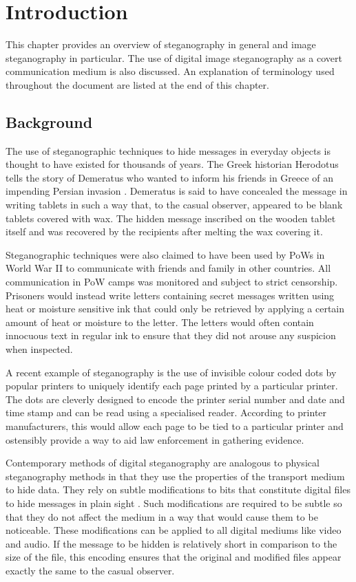 \chapter{Introduction}
\label{ch:intro}
This chapter provides an overview of steganography in general and image steganography in particular. The use of digital image steganography as a covert communication medium is also discussed. An explanation of terminology used throughout the document are listed at the end of this chapter. 
\section{Background}
The use of steganographic techniques to hide messages in everyday objects is thought to have existed for thousands of years. The Greek historian Herodotus tells the story of Demeratus who wanted to inform his friends in Greece of an impending Persian invasion  \cite{kahn1996history}. Demeratus is said to have concealed the message in writing tablets in such a way that, to the casual observer, appeared to be blank tablets covered with wax. The hidden message inscribed on the wooden tablet itself and was recovered by the recipients after melting the wax covering it. 
\par Steganographic techniques were also claimed to have been used by PoWs in World War II to communicate with friends and family in other countries. All communication in PoW camps was monitored and subject to strict censorship. Prisoners would instead write letters containing secret messages written using heat or moisture sensitive ink that could only be retrieved by applying a certain amount of heat or moisture to the letter. The letters would often contain innocuous text in regular ink to ensure that they did not arouse any suspicion when inspected.
\par A recent example of steganography is the use of invisible colour coded dots by popular printers \cite{stegprinter} to uniquely identify each page printed by a particular printer. The dots are cleverly designed to encode the printer serial number and date and time stamp and can be read using a specialised reader. According to printer manufacturers, this would allow each page to be tied to a particular printer and ostensibly provide a way to aid law enforcement in gathering evidence. 
\par Contemporary methods of digital steganography are analogous to physical steganography methods in that they use the properties of the transport medium to hide data. They rely on subtle modifications to bits that constitute digital files to hide messages in plain sight  \cite{hinson2009introduction}.  Such modifications are required to be subtle so that they do not affect the medium in a way that would cause them to be noticeable.  These  modifications can be applied to all digital mediums like video \cite{crawford2010supraliminal} and audio. If the message to be hidden is relatively short in comparison to the size of the file, this encoding ensures that the original and modified files appear exactly the same to the casual observer.

